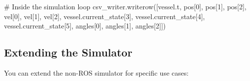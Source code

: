 \documentclass[
  letterpaper,
  DIV=11,
  numbers=noendperiod]{scrreprt}
\newenvironment{Shaded}{\begin{snugshade}}{\end{snugshade}}
\newcommand{\CommentTok}[1]{\textcolor[rgb]{0.37,0.37,0.37}{#1}}
\newcommand{\DecValTok}[1]{\textcolor[rgb]{0.68,0.00,0.00}{#1}}
\newcommand{\NormalTok}[1]{\textcolor[rgb]{0.00,0.23,0.31}{#1}}
\begin{document}
\begin{enumerate}
\begin{Shaded}
\begin{Highlighting}[]
\CommentTok{\# Inside the simulation loop}
\NormalTok{csv\_writer.writerow([vessel.t, pos[}\DecValTok{0}\NormalTok{], pos[}\DecValTok{1}\NormalTok{], pos[}\DecValTok{2}\NormalTok{], vel[}\DecValTok{0}\NormalTok{], vel[}\DecValTok{1}\NormalTok{], vel[}\DecValTok{2}\NormalTok{], }
\NormalTok{                    vessel.current\_state[}\DecValTok{3}\NormalTok{], vessel.current\_state[}\DecValTok{4}\NormalTok{], vessel.current\_state[}\DecValTok{5}\NormalTok{],}
\NormalTok{                    angles[}\DecValTok{0}\NormalTok{], angles[}\DecValTok{1}\NormalTok{], angles[}\DecValTok{2}\NormalTok{]])}
\end{Highlighting}
\end{Shaded}
\end{enumerate}

\subsection*{Extending the Simulator}\label{extending-the-simulator}

You can extend the non-ROS simulator for specific use cases:
\end{document}
